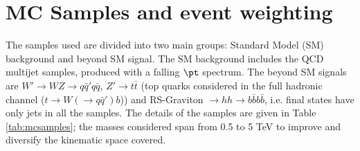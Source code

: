 \clearpage

\section{MC Samples and event weighting}
The samples used are divided into two main groups: Standard Model (SM) background and beyond SM signal. The SM background includes the QCD multijet samples, produced with a falling $\pt$ spectrum. The beyond SM signals are $W'\to WZ\to q\bar{q}'q\bar{q}$, $Z'\to t\bar{t}$ (top quarks considered in the full hadronic channel ($t\to W(\to q\bar{q}')b$)) and RS-Graviton $\to hh \to b\bar{b}b\bar{b}$, i.e. final states have only jets in all the samples. The details of the samples are given in Table \ref{tab:mcsamples}; the masses considered span from 0.5 to 5 TeV to improve and diversify the kinematic space covered.


